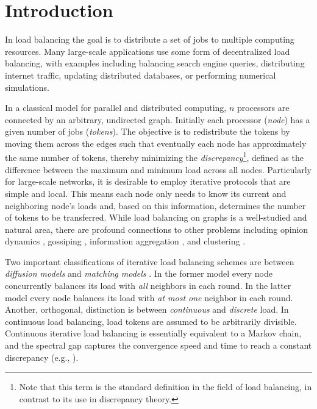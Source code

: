 \documentclass[twoside,leqno]{article}
\DeclareMathOperator{\1}{\mathbf{1}}
\numberwithin{equation}{section}
\begin{document}
\section{Introduction}


In load balancing the goal is to distribute a set of jobs to multiple computing resources. Many large-scale applications use some form of decentralized load balancing, with examples including balancing search engine queries, distributing internet traffic, updating distributed databases, or performing numerical simulations.

In a classical model for parallel and distributed computing, $n$ processors are connected by an arbitrary, undirected graph. Initially each processor (\emph{node}) has a given number of jobs (\emph{tokens}). The objective is to redistribute the tokens by moving them across the edges such that
eventually each node has approximately the same number of tokens, thereby minimizing the \emph{discrepancy}\footnote{Note that this term is the standard definition in the field of load balancing, in contrast to its use in discrepancy theory.}, defined as the difference between the maximum and minimum load across all nodes. Particularly for large-scale networks, it is desirable to employ iterative protocols that are simple and local. This means each node only needs to know its current and neighboring node's loads and, based on this information, determines the number of tokens to be transferred. While
load balancing on graphs is a well-studied and natural area, there are profound connections to other problems including opinion dynamics \cite{DBLP:conf/podc/BerenbrinkCGMMR23}, gossiping \cite{DBLP:journals/tit/BoydGPS06}, information aggregation \cite{DBLP:conf/focs/KempeDG03}, and clustering \cite{DBLP:conf/soda/BecchettiCNPT17}.

Two important classifications of iterative  load balancing schemes are between  \emph{diffusion models} and \emph{matching models} \cite{DBLP:journals/pc/DiekmannFM99}.
In the former model every node concurrently balances its load with \emph{all} neighbors in each round.
In the latter model every node balances its load with \emph{at most one} neighbor in each round.
Another, orthogonal, distinction is between \emph{continuous} and \emph{discrete} load.
In continuous load balancing, load tokens are assumed to be arbitrarily divisible.
Continuous iterative load balancing is essentially equivalent to a Markov chain, and the spectral gap captures the convergence speed and time to reach a constant discrepancy (e.g., \cite{DBLP:conf/focs/RabaniSW98}).
\end{document}
